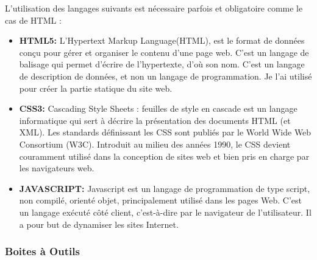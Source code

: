 \documentclass[12pt]{article}
\begin{document}
L'utilisation des langages suivants est nécessaire parfois et obligatoire comme le cas de HTML :
\begin{itemize}
\item \textbf{HTML5:} L’Hypertext Markup Language(HTML), est le format de données conçu pour gérer
et organiser le contenu d'une page web. C’est un langage de balisage qui
permet d’écrire de l’hypertexte, d’où son nom. C'est un langage de description
de données, et non un langage de programmation. Je l’ai utilisé pour créer la
partie statique du site web.

\item \textbf{CSS3:} Cascading Style Sheets : feuilles de style en cascade est un langage informatique
qui sert à décrire la présentation des documents HTML (et XML). Les standards
définissant les CSS sont publiés par le World Wide Web Consortium (W3C). Introduit au
milieu des années 1990, le CSS devient couramment utilisé dans la conception de sites
web et bien pris en charge par les navigateurs web.

\item \textbf{JAVASCRIPT:} Javascript est un langage de programmation de type script, non compilé, orienté
objet, principalement utilisé dans les pages Web. C’est un langage exécuté  côté client, c'est-à-dire par le navigateur de l’utilisateur. Il a pour but de dynamiser les
sites Internet.
\end{itemize}

\subsubsection{Boites à Outils}
\end{document}
